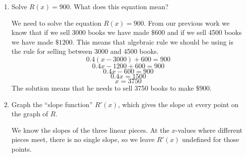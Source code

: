 \documentclass{article}
\begin{document}
\begin{enumerate}
\begin{enumerate}
    \begin{solution}
      One check we could perform on our formula for $R(x)$ is to test various inputs and check
      if we get the expected outputs.
    \end{solution}

  \item


    \begin{problem}[\vfill]
      Solve $R(x) = 900$. What does this equation mean?
    \end{problem}

    \begin{solution} 
      We need to solve the equation $R(x) = 900$. From our previous work we know that if we sell 3000 books we have made $\$600$ and if we sell 4500 books we have made $\$1200$. This means that algebraic rule we should be using is the rule for selling between 3000 and 4500 books.  
      $$0.4(x-3000) +600 =900$$ 
      $$0.4x -1200+600=900$$
      $$0.4x-600=900$$
      $$0.4x=1500$$
      $$x =3750$$
      The solution means that he needs to sell 3750 books to make $\$900$. 
    \end{solution} 

  \item


    \begin{problem}[\vfill]
      Graph the ``slope function'' $R'(x)$, which gives the slope at every
      point on the graph of $R$. 
    \end{problem}

    \begin{solution} 
    We know the slopes of the three linear pieces. At the $x$-values
    where different pieces meet, there is no single slope, so we leave
    $R'(x)$ undefined for those points.
    \end{solution} 


\end{enumerate}
\end{enumerate}
\end{document}

